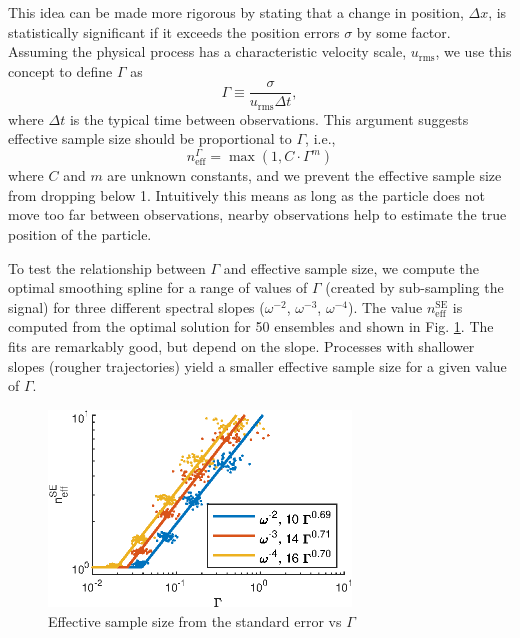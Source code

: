 \documentclass{ametsoc}
\begin{document}
This idea can be made more rigorous by stating that a change in position, $\Delta x$, is statistically significant if it exceeds the position errors $\sigma$ by some factor.  Assuming the physical process has a characteristic velocity scale, $u_{\textrm{rms}}$, we use this concept to define $\Gamma$ as
\begin{equation}
\label{gamma_def}
\Gamma \equiv \frac{\sigma}{u_{\textrm{rms}}\Delta t},
\end{equation}
where $\Delta t$ is the typical time between observations. This argument suggests effective sample size should be proportional to $\Gamma$, i.e.,
\begin{equation}
\label{gamma_equation}
n_{\textrm{eff}}^\Gamma = \max\left(1,C \cdot \Gamma^m\right)
\end{equation}
where $C$ and $m$ are unknown constants, and we prevent the effective sample size from dropping below 1. Intuitively this means as long as the particle does not move too far between observations, nearby observations help to estimate the true position of the particle.

To test the relationship between $\Gamma$ and effective sample size, we compute the optimal smoothing spline for a range of values of $\Gamma$ (created by sub-sampling the signal) for three different spectral slopes ($\omega^{-2}$, $\omega^{-3}$, $\omega^{-4}$). The value $n_{\textrm{eff}}^\textrm{SE}$ is computed from the optimal solution for 50 ensembles and shown in Fig. \ref{dofVsGamma}. The fits are remarkably good, but depend on the slope. Processes with shallower slopes (rougher trajectories) yield a smaller effective sample size for a given value of $\Gamma$. 

\begin{figure}
  \centerline{\includegraphics[width=19pc,angle=0]{dofVsGamma.eps}}
  \caption{Effective sample size from the standard error vs $\Gamma$}
  \label{dofVsGamma}
\end{figure}
\end{document}
